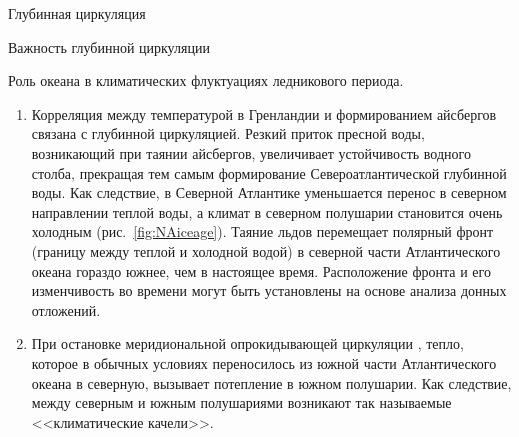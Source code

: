 \begin{chapter}{Глубинная циркуляция}
\begin{section}{Важность глубинной циркуляции}
\begin{paragraph}{Роль океана в климатических флуктуациях ледникового периода.}
\begin{enumerate}
\item 
Корреляция между температурой в Гренландии и формированием айсбергов связана
с глубинной циркуляцией. Резкий приток пресной воды, возникающий при таянии
айсбергов, увеличивает устойчивость водного столба, прекращая тем самым 
формирование Североатлантической глубинной 
воды. Как следствие, в Северной 
Атлантике уменьшается перенос в северном 
направлении теплой воды, а климат в северном
полушарии становится очень холодным (рис.~\ref{fig:NAiceage}). 
Таяние льдов перемещает полярный фронт (границу между теплой и холодной водой)
в северной части Атлантического океана гораздо южнее, чем в настоящее время.
Расположение фронта и его изменчивость во времени могут быть установлены
на основе анализа донных отложений.
%

\item 
При остановке меридиональной опрокидывающей циркуляции%
, тепло, которое в обычных 
условиях переносилось из южной части Атлантического океана в северную,
вызывает потепление в южном полушарии. Как следствие, между северным и южным
полушариями возникают так называемые <<климатические качели>>.
%


\end{enumerate}
\end{paragraph}
\end{section}
\end{chapter}
